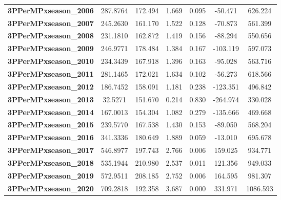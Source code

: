 \begin{center}
\begin{tabular}{lcccccc}
\textbf{3PPerMPxseason\_2006} &     287.8764  &      172.494     &     1.669  &         0.095        &      -50.471    &      626.224     \\
\textbf{3PPerMPxseason\_2007} &     245.2630  &      161.170     &     1.522  &         0.128        &      -70.873    &      561.399     \\
\textbf{3PPerMPxseason\_2008} &     231.1810  &      162.872     &     1.419  &         0.156        &      -88.294    &      550.656     \\
\textbf{3PPerMPxseason\_2009} &     246.9771  &      178.484     &     1.384  &         0.167        &     -103.119    &      597.073     \\
\textbf{3PPerMPxseason\_2010} &     234.3439  &      167.918     &     1.396  &         0.163        &      -95.028    &      563.716     \\
\textbf{3PPerMPxseason\_2011} &     281.1465  &      172.021     &     1.634  &         0.102        &      -56.273    &      618.566     \\
\textbf{3PPerMPxseason\_2012} &     186.7452  &      158.091     &     1.181  &         0.238        &     -123.351    &      496.842     \\
\textbf{3PPerMPxseason\_2013} &      32.5271  &      151.670     &     0.214  &         0.830        &     -264.974    &      330.028     \\
\textbf{3PPerMPxseason\_2014} &     167.0013  &      154.304     &     1.082  &         0.279        &     -135.666    &      469.668     \\
\textbf{3PPerMPxseason\_2015} &     239.5770  &      167.538     &     1.430  &         0.153        &      -89.050    &      568.204     \\
\textbf{3PPerMPxseason\_2016} &     341.3336  &      180.649     &     1.889  &         0.059        &      -13.010    &      695.678     \\
\textbf{3PPerMPxseason\_2017} &     546.8977  &      197.743     &     2.766  &         0.006        &      159.025    &      934.771     \\
\textbf{3PPerMPxseason\_2018} &     535.1944  &      210.980     &     2.537  &         0.011        &      121.356    &      949.033     \\
\textbf{3PPerMPxseason\_2019} &     572.9511  &      208.185     &     2.752  &         0.006        &      164.595    &      981.307     \\
\textbf{3PPerMPxseason\_2020} &     709.2818  &      192.358     &     3.687  &         0.000        &      331.971    &     1086.593     \\

\end{tabular}
\end{center}
